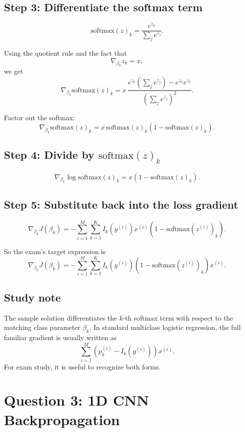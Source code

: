 \documentclass[11pt]{article}
\begin{document}
\subsection*{Step 3: Differentiate the softmax term}

\[
    \text{softmax}(z)_k
    =
    \frac{e^{z_k}}{\sum_j e^{z_j}}.
\]

Using the quotient rule and the fact that
\[
    \nabla_{\beta_k} z_k = x,
\]
we get
\[
    \nabla_{\beta_k}\text{softmax}(z)_k
    =
    x\,
    \frac{e^{z_k}\left(\sum_j e^{z_j}\right)-e^{z_k}e^{z_k}}
         {\left(\sum_j e^{z_j}\right)^2}.
\]

Factor out the softmax:
\[
    \nabla_{\beta_k}\text{softmax}(z)_k
    =
    x\,\text{softmax}(z)_k\left(1-\text{softmax}(z)_k\right).
\]

\subsection*{Step 4: Divide by \(\text{softmax}(z)_k\)}

\[
    \nabla_{\beta_k}\log \text{softmax}(z)_k
    =
    x\left(1-\text{softmax}(z)_k\right).
\]

\subsection*{Step 5: Substitute back into the loss gradient}

\[
    \nabla_{\beta_k}J(\beta_k)
    =
    -\sum_{i=1}^{M}\sum_{k=1}^{K}
    I_k(y^{(i)})
    x^{(i)}
    \left(1-\text{softmax}(z^{(i)})_k\right).
\]

So the exam's target expression is
\[
    \boxed{
    \nabla_{\beta_k}J(\beta_k)
    =
    -\sum_{i=1}^{M}\sum_{k=1}^{K}
    I_k(y^{(i)})
    \left(1-\text{softmax}(z^{(i)})_k\right)x^{(i)}
    }.
\]

\subsection*{Study note}

The sample solution differentiates the \(k\)-th softmax term with respect to the
matching class parameter \(\beta_k\). In standard multiclass logistic regression,
the full familiar gradient is usually written as
\[
    \sum_{i=1}^{M}\left(p_k^{(i)}-I_k(y^{(i)})\right)x^{(i)}.
\]
For exam study, it is useful to recognize both forms.

\section*{Question 3: 1D CNN Backpropagation}
\end{document}

